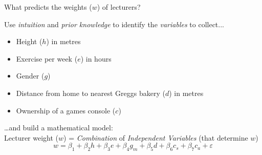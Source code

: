 \documentclass[xcolor=x11names,compress]{beamer}
\renewcommand{\(}{\begin{columns}}
\renewcommand{\)}{\end{columns}}
\newcommand{\<}[1]{\begin{column}{#1}}
\renewcommand{\>}{\end{column}}
\begin{document}
  \begin{frame}{What predicts the weights ($w$) of lecturers?}
  
  Use {\it intuition} and {\it prior knowledge} to identify the {\it variables} to collect...
  \begin{itemize}[<+->]
  
      \item Height ($h$) in metres
      \item Exercise per week ($e$) in hours
      \item Gender ($g$)
      \item Distance from home to nearest Greggs bakery ($d$) in metres
      \item Ownership of a games console ($c$)
  
  \pause
  \end{itemize}
  \vspace{12pt}
  \ldots and build a mathematical model:\\
  \vspace{6pt}
  Lecturer weight ($w$) = {\it Combination} of {\it Independent Variables} (that determine $w$)
  \pause
  $$w = \beta_1 + \beta_2 h + \beta_3 e + \beta_4 g_m  + \beta_5 d + \beta_6 c_s + \beta_7 c_a + \varepsilon$$
  
\end{frame}
\end{document}
